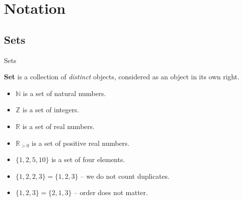 \documentclass{beamer}
\begin{document}
    \section{Notation}

    \subsection{Sets}

    \begin{frame}{Sets}
      \begin{definition}
        \textbf{Set} is a collection of \textit{distinct} objects, considered as an object in its own right.
      \end{definition}

      \begin{example}
        \begin{itemize}
          \item $\mathbb{N}$ is a set of natural numbers.
          \item $\mathbb{Z}$ is a set of integers.
          \item $\mathbb{R}$ is a set of real numbers.
          \item $\mathbb{R}_{>0}$ is a set of positive real numbers.
          \item $\{1, 2, 5, 10\}$ is a set of four elements.
          \item $\{1, 2, 2, 3\} = \{1,2,3\}$ -- we do not count duplicates.
          \item $\{1,2,3\} = \{2,1,3\}$ -- order does not matter.
        \end{itemize}
      \end{example}
    \end{frame}
\end{document}
